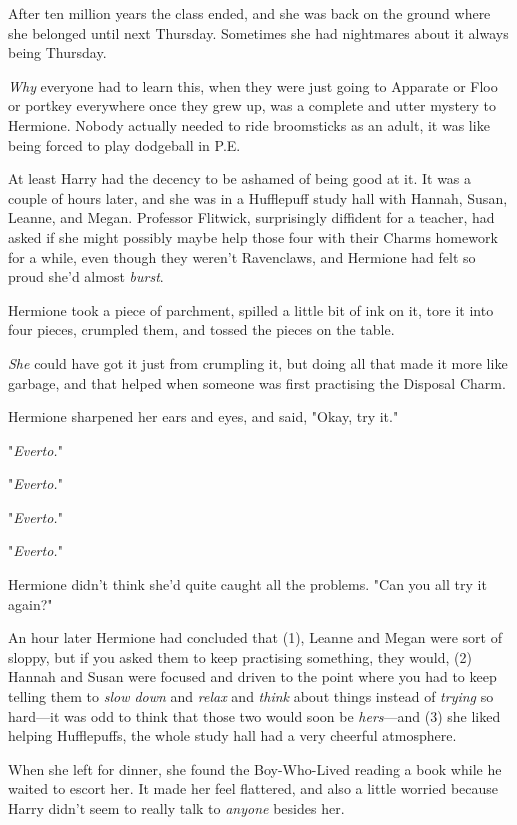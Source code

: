 After ten million years the class ended, and she was back on the ground where
she belonged until next Thursday. Sometimes she had nightmares about it always
being Thursday.

\emph{Why} everyone had to learn this, when they were just going to Apparate or
Floo or portkey everywhere once they grew up, was a complete and utter mystery
to Hermione. Nobody actually needed to ride broomsticks as an adult, it was
like being forced to play dodgeball in P.E.

At least Harry had the decency to be ashamed of being good at it.
\later
It was a couple of hours later, and she was in a Hufflepuff study hall with
Hannah, Susan, Leanne, and Megan. Professor Flitwick, surprisingly diffident
for a teacher, had asked if she might possibly maybe help those four with their
Charms homework for a while, even though they weren't Ravenclaws, and Hermione
had felt so proud she'd almost \emph{burst}.

Hermione took a piece of parchment, spilled a little bit of ink on it, tore it
into four pieces, crumpled them, and tossed the pieces on the table.

\emph{She} could have got it just from crumpling it, but doing all that made
it more like garbage, and that helped when someone was first practising the
Disposal Charm.

Hermione sharpened her ears and eyes, and said, "Okay, try it."

"\emph{Everto.}"

"\emph{Everto.}"

"\emph{Everto.}"

"\emph{Everto.}"

Hermione didn't think she'd quite caught all the problems. "Can you all try it
again?"

An hour later Hermione had concluded that (1), Leanne and Megan were sort of
sloppy, but if you asked them to keep practising something, they would, (2)
Hannah and Susan were focused and driven to the point where you had to keep
telling them to \emph{slow down} and \emph{relax} and \emph{think} about things
instead of \emph{trying} so hard---it was odd to think that those two would
soon be \emph{hers}---and (3) she liked helping Hufflepuffs, the whole study
hall had a very cheerful atmosphere.

When she left for dinner, she found the Boy-Who-Lived reading a book while he
waited to escort her. It made her feel flattered, and also a little worried
because Harry didn't seem to really talk to \emph{anyone} besides her.

